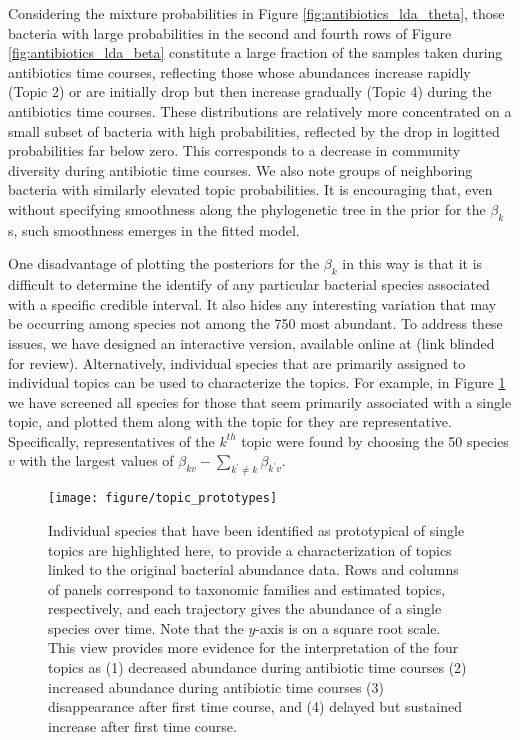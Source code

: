 \documentclass[oupdraft]{bio}
\begin{document}
Considering the mixture probabilities in Figure \ref{fig:antibiotics_lda_theta},
those bacteria with large probabilities in the second and fourth rows of Figure
\ref{fig:antibiotics_lda_beta} constitute a large fraction of the samples taken
during antibiotics time courses, reflecting those whose abundances increase
rapidly (Topic 2) or are initially drop but then increase gradually (Topic 4)
during the antibiotics time courses. These distributions are relatively more
concentrated on a small subset of bacteria with high probabilities, reflected by
the drop in logitted probabilities far below zero. This corresponds to a
decrease in community diversity during antibiotic time courses. We also note
groups of neighboring bacteria with similarly elevated topic probabilities. It
is encouraging that, even without specifying smoothness along the phylogenetic
tree in the prior for the $\beta_{k}$s, such smoothness emerges in the fitted
model.

One disadvantage of plotting the posteriors for the $\beta_{k}$ in this way is
that it is difficult to determine the identify of any particular bacterial
species associated with a specific credible interval. It also hides any
interesting variation that may be occurring among species not among the 750 most
abundant. To address these issues, we have designed an interactive version,
available online at
(link blinded for review). Alternatively, individual species that are primarily
assigned to individual topics can be used to characterize the topics. For
example, in Figure \ref{fig:topic_prototypes} we have screened all species for
those that seem primarily associated with a single topic, and plotted them along
with the topic for they are representative. Specifically, representatives of the
$k^{th}$ topic were found by choosing the 50 species $v$ with the largest values
of $\beta_{kv} - \sum_{k^{\prime} \neq k} \beta_{k^{\prime} v}$.

\begin{figure}[!p]
  \centering\texttt{[image: figure/topic\_prototypes]}
  \caption{Individual species that have been identified as prototypical of
    single topics are highlighted here, to provide a characterization of topics
    linked to the original bacterial abundance data. Rows and columns of panels
    correspond to taxonomic families and estimated topics,
    respectively, and each trajectory gives the abundance of a single species
    over time. Note that the $y$-axis is on a square root scale. This view
    provides more evidence for the interpretation of the four topics as (1)
    decreased abundance during antibiotic time courses (2) increased abundance during
    antibiotic time courses (3) disappearance after first time course, and (4)
    delayed but sustained increase after first time
    course. \label{fig:topic_prototypes}}
\end{figure}
\end{document}

